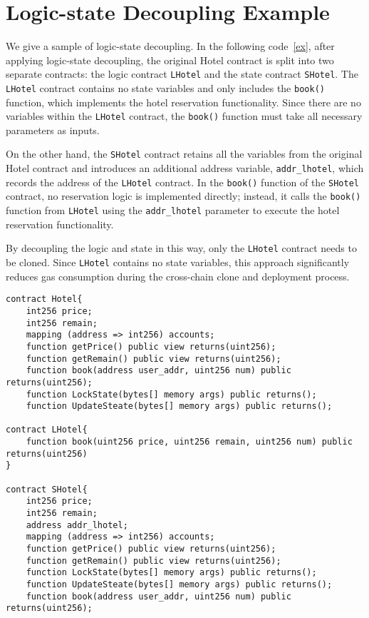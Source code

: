 \appendix

\section{Logic-state Decoupling Example}
\label{codeex}

We give a sample of logic-state decoupling. In the following code~\ref{ex}, after applying logic-state decoupling, the original Hotel contract is split into two separate contracts: the logic contract \texttt{LHotel} and the state contract \texttt{SHotel}. The \texttt{LHotel} contract contains no state variables and only includes the \texttt{book()} function, which implements the hotel reservation functionality. Since there are no variables within the \texttt{LHotel} contract, the \texttt{book()} function must take all necessary parameters as inputs.

On the other hand, the \texttt{SHotel} contract retains all the variables from the original Hotel contract and introduces an additional address variable, \texttt{addr\_lhotel}, which records the address of the \texttt{LHotel} contract. In the \texttt{book()} function of the \texttt{SHotel} contract, no reservation logic is implemented directly; instead, it calls the \texttt{book()} function from \texttt{LHotel} using the \texttt{addr\_lhotel} parameter to execute the hotel reservation functionality.

By decoupling the logic and state in this way, only the \texttt{LHotel} contract needs to be cloned. 
Since \texttt{LHotel} contains no state variables, this approach significantly reduces gas consumption during the cross-chain clone and deployment process.

\begin{lstlisting}[language=Solidity, caption={Pseudocode of Hotel Logic-State Decoupling}, label={ex}]
contract Hotel{
    int256 price;
    int256 remain;
    mapping (address => int256) accounts;
    function getPrice() public view returns(uint256); 
    function getRemain() public view returns(uint256); 
    function book(address user_addr, uint256 num) public returns(uint256); 
    function LockState(bytes[] memory args) public returns();
    function UpdateSteate(bytes[] memory args) public returns();

contract LHotel{
    function book(uint256 price, uint256 remain, uint256 num) public returns(uint256)
}

contract SHotel{
    int256 price;
    int256 remain;
    address addr_lhotel;
    mapping (address => int256) accounts;
    function getPrice() public view returns(uint256); 
    function getRemain() public view returns(uint256); 
    function LockState(bytes[] memory args) public returns();
    function UpdateSteate(bytes[] memory args) public returns();
    function book(address user_addr, uint256 num) public returns(uint256);

\end{lstlisting}
